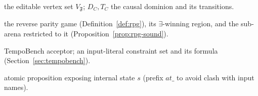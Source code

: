 \documentclass[11pt]{article}
\theoremstyle{remark}
\newcommand{\Frame}{\mathfrak{F}}
\begin{document}
\begin{description}[leftmargin=2.6cm,style=nextline]
        the editable vertex set \(V_{\Frame}\); \(D_C,T_C\) the causal dominion and
        its transitions.
  \item[{\(G^{\mathrm{rev}}_{M,\Frame,C,E}\), \(W_\exists\), \(\mathcal{A}[W_\exists]\)}]
        the reverse parity game (Definition~\ref{def:rpg}), its
        \(\exists\)-winning region, and the sub-arena restricted to it
        (Proposition~\ref{prop:rpg-sound}).
  \item[\(A_{\mathrm{HOA}}\), \(\Gamma\), \(C_\Gamma\)] TempoBench acceptor; an
        input-literal constraint set and its formula (Section~\ref{sec:tempobench}).
  \item[\(\mathit{at\_s}\)] atomic proposition exposing internal state \(s\)
        (prefix \(\mathit{at\_}\) to avoid clash with input names).
\end{description}
\end{document}
